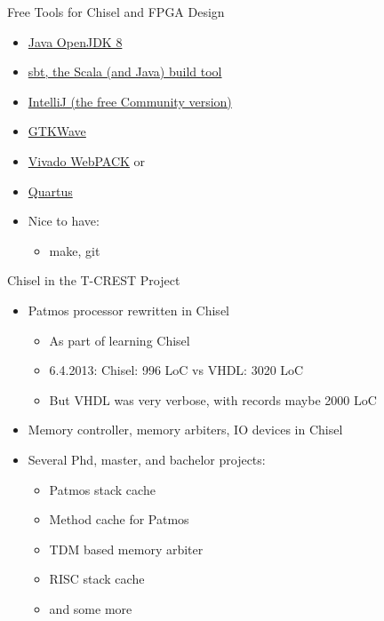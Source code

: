 \begin{frame}[fragile]{Free Tools for Chisel and FPGA Design}
\begin{itemize}
\item \href{https://adoptopenjdk.net/}{Java OpenJDK 8}
\item \href{https://www.scala-sbt.org/}{sbt, the Scala (and Java) build tool}
\item \href{https://www.jetbrains.com/idea/download/}{IntelliJ (the free Community version)}
\item \href{http://gtkwave.sourceforge.net/}{GTKWave}
\item \href{https://www.xilinx.com/products/design-tools/vivado/vivado-webpack.html}{Vivado WebPACK} or
\item \href{http://www.altera.com/products/software/quartus-ii/web-edition/qts-we-index.html}{Quartus}
\item Nice to have:
\begin{itemize}
\item make, git
\end{itemize}
\end{itemize}
\end{frame}



\begin{frame}[fragile]{Chisel in the T-CREST Project}
\begin{itemize}
\item Patmos processor rewritten in Chisel
\begin{itemize}
\item As part of learning Chisel
\item 6.4.2013: Chisel: 996 LoC vs VHDL: 3020 LoC
\item But VHDL was very verbose, with records maybe 2000 LoC
\end{itemize}
\item Memory controller, memory arbiters, IO devices in Chisel
\item Several Phd, master, and bachelor projects:
\begin{itemize}
\item Patmos stack cache
\item Method cache for Patmos
\item TDM based memory arbiter
\item RISC stack cache
\item and some more
\end{itemize}
\end{itemize}
\end{frame}

